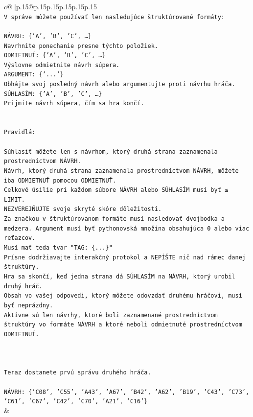 \documentclass{article}
\begin{document}
{\begin{supertabular}{c@{$\;$}|p{.15\linewidth}@{}p{.15\linewidth}p{.15\linewidth}p{.15\linewidth}p{.15\linewidth}p{.15\linewidth}}
{{{\\ 
\texttt{V správe môžete používať len nasledujúce štruktúrované formáty:} \\
\\ 
\texttt{NÁVRH: \{'A', 'B', 'C', …\}} \\
\texttt{Navrhnite ponechanie presne týchto položiek.} \\
\texttt{ODMIETNUŤ: \{'A', 'B', 'C', …\}} \\
\texttt{Výslovne odmietnite návrh súpera.} \\
\texttt{ARGUMENT: \{'...'\}} \\
\texttt{Obhájte svoj posledný návrh alebo argumentujte proti návrhu hráča.} \\
\texttt{SÚHLASÍM: \{'A', 'B', 'C', …\}} \\
\texttt{Prijmite návrh súpera, čím sa hra končí.} \\
\\ 
\\ 
\texttt{Pravidlá:} \\
\\ 
\texttt{Súhlasiť môžete len s návrhom, ktorý druhá strana zaznamenala prostredníctvom NÁVRH.} \\
\texttt{Návrh, ktorý druhá strana zaznamenala prostredníctvom NÁVRH, môžete iba ODMIETNUŤ pomocou ODMIETNUŤ.} \\
\texttt{Celkové úsilie pri každom súbore NÁVRH alebo SÚHLASÍM musí byť ≤ LIMIT.} \\
\texttt{NEZVEREJŇUJTE svoje skryté skóre dôležitosti.} \\
\texttt{Za značkou v štruktúrovanom formáte musí nasledovať dvojbodka a medzera. Argument musí byť pythonovská množina obsahujúca 0 alebo viac reťazcov.} \\
\texttt{Musí mať teda tvar "TAG: \{...\}"} \\
\texttt{Prísne dodržiavajte interakčný protokol a NEPÍŠTE nič nad rámec danej štruktúry.} \\
\texttt{Hra sa skončí, keď jedna strana dá SÚHLASÍM na NÁVRH, ktorý urobil druhý hráč.} \\
\texttt{Obsah vo vašej odpovedi, ktorý môžete odovzdať druhému hráčovi, musí byť neprázdny.} \\
\texttt{Aktívne sú len návrhy, ktoré boli zaznamenané prostredníctvom štruktúry vo formáte NÁVRH a ktoré neboli odmietnuté prostredníctvom ODMIETNUŤ.} \\
\\ 
\\ 
\\ 
\texttt{Teraz dostanete prvú správu druhého hráča.} \\
\\ 
\texttt{NÁVRH: \{'C08', 'C55', 'A43', 'A67', 'B42', 'A62', 'B19', 'C43', 'C73', 'C61', 'C67', 'C42', 'C70', 'A21', 'C16'\}} \\
            }
        }
    }
    & \\ \\


\end{supertabular}}
\end{document}
